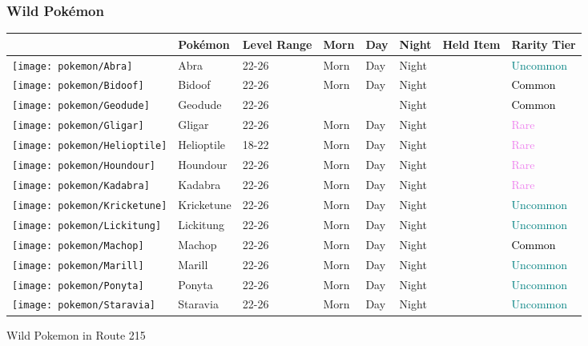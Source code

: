 \subsubsection{Wild Pokémon}%
\label{ssubsec:WildPokmon}%
\begin{longtable}{||l l l l l l l l||}%
\hline%
&Pokémon&Level Range&Morn&Day&Night&Held Item&Rarity Tier\\%
\hline%
\endhead%
\hline%
\texttt{[image: pokemon/Abra]}&Abra&22{-}26&Morn&Day&Night&&\textcolor{teal}{%
Uncommon%
}\\%
\hline%
\texttt{[image: pokemon/Bidoof]}&Bidoof&22{-}26&Morn&Day&Night&&\textcolor{black}{%
Common%
}\\%
\hline%
\texttt{[image: pokemon/Geodude]}&Geodude&22{-}26&&&Night&&\textcolor{black}{%
Common%
}\\%
\hline%
\texttt{[image: pokemon/Gligar]}&Gligar&22{-}26&Morn&Day&Night&&\textcolor{violet}{%
Rare%
}\\%
\hline%
\texttt{[image: pokemon/Helioptile]}&Helioptile&18{-}22&Morn&Day&Night&&\textcolor{violet}{%
Rare%
}\\%
\hline%
\texttt{[image: pokemon/Houndour]}&Houndour&22{-}26&Morn&Day&Night&&\textcolor{violet}{%
Rare%
}\\%
\hline%
\texttt{[image: pokemon/Kadabra]}&Kadabra&22{-}26&Morn&Day&Night&&\textcolor{violet}{%
Rare%
}\\%
\hline%
\texttt{[image: pokemon/Kricketune]}&Kricketune&22{-}26&Morn&Day&Night&&\textcolor{teal}{%
Uncommon%
}\\%
\hline%
\texttt{[image: pokemon/Lickitung]}&Lickitung&22{-}26&Morn&Day&Night&&\textcolor{teal}{%
Uncommon%
}\\%
\hline%
\texttt{[image: pokemon/Machop]}&Machop&22{-}26&Morn&Day&Night&&\textcolor{black}{%
Common%
}\\%
\hline%
\texttt{[image: pokemon/Marill]}&Marill&22{-}26&Morn&Day&Night&&\textcolor{teal}{%
Uncommon%
}\\%
\hline%
\texttt{[image: pokemon/Ponyta]}&Ponyta&22{-}26&Morn&Day&Night&&\textcolor{teal}{%
Uncommon%
}\\%
\hline%
\texttt{[image: pokemon/Staravia]}&Staravia&22{-}26&Morn&Day&Night&&\textcolor{teal}{%
Uncommon%
}\\%
\hline%
\end{longtable}%
\caption{Wild Pokemon in Route 215}